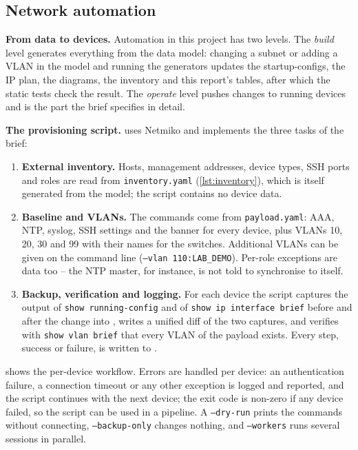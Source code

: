 \subsection{Network automation}\label{sec:automation}
\textbf{From data to devices.} Automation in this project has two levels. The \emph{build} level generates
everything from the data model: changing a subnet or adding a VLAN in the model and running the generators
updates the startup-configs, the IP plan, the diagrams, the inventory and this report's tables, after which
the static tests check the result. The \emph{operate} level pushes changes to running devices and is the part
the brief specifies in detail.

\textbf{The provisioning script.}  uses Netmiko \cite{netmiko} and
implements the three tasks of the brief:

\begin{enumerate}
  \item \textbf{External inventory.} Hosts, management addresses, device types, SSH ports and roles are read
        from \texttt{inventory.yaml} (\cref{lst:inventory}), which is itself generated from the model; the
        script contains no device data.
  \item \textbf{Baseline and VLANs.} The commands come from \texttt{payload.yaml}: AAA, NTP, syslog, SSH
        settings and the banner for every device, plus VLANs 10, 20, 30 and 99 with their names for the
        switches. Additional VLANs can be given on the command line (\texttt{--vlan 110:LAB\_DEMO}). Per-role
        exceptions are data too -- the NTP master, for instance, is not told to synchronise to itself.
  \item \textbf{Backup, verification and logging.} For each device the script captures the output of
        \texttt{show running-config} and of \texttt{show ip interface brief} before and after the change into
        , writes a unified diff of the two captures, and
        verifies with \texttt{show vlan brief} that every VLAN of the payload exists. Every step, success or
        failure, is written to .
\end{enumerate}

 shows the per-device workflow. Errors are handled per device: an authentication failure,
a connection timeout or any other exception is logged and reported, and the script continues with the next
device; the exit code is non-zero if any device failed, so the script can be used in a pipeline. A
\texttt{--dry-run} prints the commands without connecting, \texttt{--backup-only} changes nothing, and
\texttt{--workers} runs several sessions in parallel.

